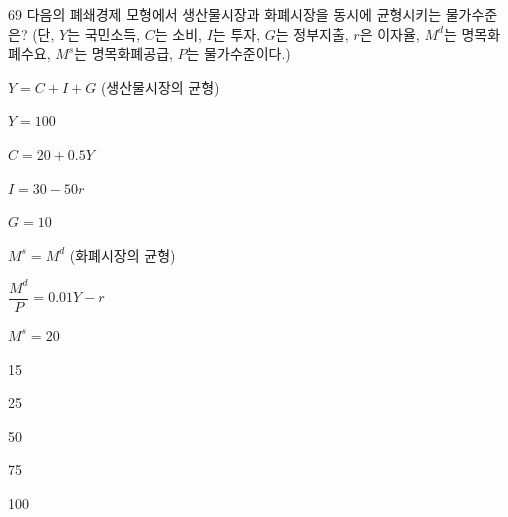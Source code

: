 \begin{question}{69}
다음의 폐쇄경제 모형에서 생산물시장과 화폐시장을 동시에 균형시키는 물가수준은? (단, $Y$는 국민소득, $C$는 소비, $I$는 투자, $G$는 정부지출, $r$은 이자율, $M^{d}$는 명목화폐수요, $M^{s}$는 명목화폐공급, $P$는 물가수준이다.)
\begin{framedtext}
$Y=C+I+G$ (생산물시장의 균형) \par
$Y=100$ \par
$C=20+0.5Y$ \par
$I=30-50r$ \par
$G=10$ \par
$M^{s}=M^{d}$ (화폐시장의 균형) \par
$\dfrac{M^{d}}{P}=0.01Y-r$ \par
$M^{s}=20$ \par
\end{framedtext}
\begin{choices}
  \item 15
  \item 25
  \item 50
  \item 75
  \item 100
\end{choices}
\end{question}
